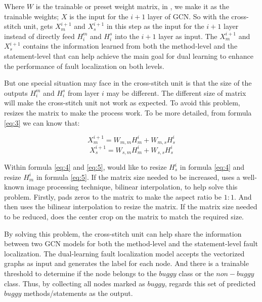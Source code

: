 Where $W$ is the trainable or preset weight matrix, in \tool, we make it as the trainable weights; $X$ is the input for the $i+1$ layer of GCN. So with the cross-stitch unit, \tool gets $X_m^{i+1}$ and $X_s^{i+1}$ in this step as the input for the $i+1$ layer instead of directly feed $H_i^m$ and $H_i^s$ into the $i+1$ layer as input. The $X_m^{i+1}$ and $X_s^{i+1}$ contains the information learned from both the method-level and the statement-level that can help achieve the main goal for dual learning to enhance the performance of fault localization on both levels.

But one special situation \tool may face in the cross-stitch unit is that the size of the outputs $H_i^m$ and $H_i^s$ from layer $i$ may be different. The different size of matrix will make the cross-stitch unit not work as expected. To avoid this problem, \tool resizes the matrix to make the process work. To be more detailed, from formula \ref{eq:3} we can know that:

\begin{equation}\label{eq:4}
	X_m^{i+1} = W_{m,m}H_m^{i} + W_{m,s}H_s^{i}
\end{equation}
\begin{equation}\label{eq:5}
	X_s^{i+1} = W_{s,m}H_m^{i} + W_{s,s}H_s^{i}
\end{equation}

Within formula \ref{eq:4} and \ref{eq:5}, \tool would like to resize $H_s^{i}$ in formula \ref{eq:4} and resize $H_m^{i}$ in formula \ref{eq:5}. If the matrix size needed to be increased, \tool uses a well-known image processing technique, bilinear interpolation, to help solve this problem. Firstly, \tool pads zeros to the matrix to make the aspect ratio be $1:1$. And then \tool uses the bilinear interpolation to resize the matrix. If the matrix size needed to be reduced, \tool does the center crop on the matrix to match the required size.

By solving this problem, the cross-stitch unit can help share the information between two GCN models for both the method-level and the statement-level fault localization. The dual-learning fault localization model accepts the vectorized graphs as input and generates the label for each node. And there is a trainable threshold to determine if the node belongs to the $buggy$ class or the $non-buggy$ class. Thus, by collecting all nodes marked as $buggy$, \tool regards this set of predicted $buggy$ methods/statements as the output. 


